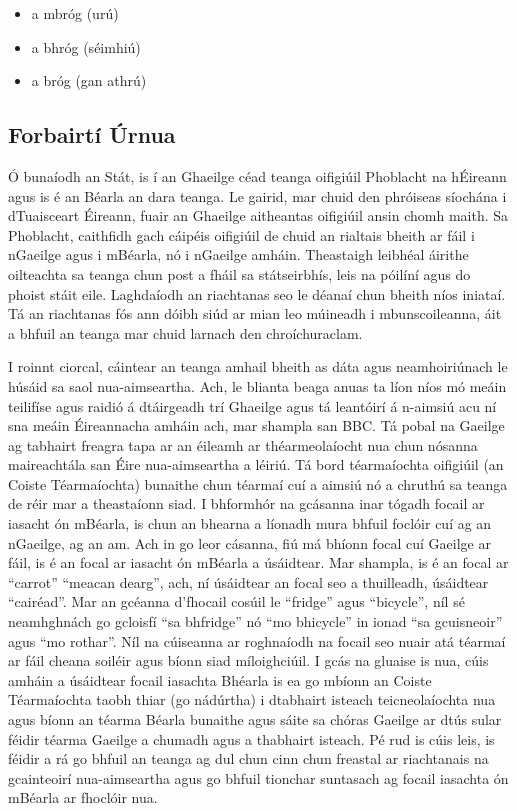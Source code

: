 \documentclass[]{../../metanetpaper}
\begin{document}
\begin{multicols}{2}
\begin{itemize}
\item a mbróg (urú)
\item a bhróg (séimhiú)
\item a bróg (gan athrú)
\end{itemize}  



\subsection{Forbairtí Úrnua}

Ó bunaíodh an Stát, is í an Ghaeilge céad teanga oifigiúil Phoblacht na hÉireann agus is é an Béarla an dara teanga. Le gairid, mar chuid den phróiseas síochána i dTuaisceart Éireann, fuair an Ghaeilge aitheantas oifigiúil ansin chomh maith. Sa Phoblacht, caithfidh gach cáipéis oifigiúil de chuid an rialtais bheith ar fáil i nGaeilge agus i mBéarla, nó i nGaeilge amháin. Theastaigh leibhéal áirithe oilteachta sa teanga chun post a fháil sa státseirbhís, leis na póilíní agus do phoist stáit eile. Laghdaíodh an riachtanas seo le déanaí chun bheith níos iniataí. Tá an riachtanas fós ann dóibh siúd ar mian leo múineadh i mbunscoileanna, áit a bhfuil an teanga mar chuid larnach den chroíchuraclam.

I roinnt ciorcal, cáintear an teanga amhail bheith as dáta agus neamhoiriúnach le húsáid sa saol nua-aimseartha. Ach, le blianta beaga anuas ta líon níos mó meáin teilifíse agus raidió á dtáirgeadh trí Ghaeilge agus tá leantóirí á n-aimsiú acu ní sna meáin Éireannacha amháin ach, mar shampla san BBC. Tá pobal na Gaeilge ag tabhairt freagra tapa ar an éileamh ar théarmeolaíocht nua chun nósanna maireachtála san Éire nua-aimseartha a léiriú. Tá bord téarmaíochta oifigiúil (an Coiste Téarmaíochta) bunaithe chun téarmaí cuí a aimsiú nó a chruthú sa teanga de réir mar a theastaíonn siad. I bhformhór na gcásanna inar tógadh focail ar iasacht ón mBéarla, is chun an bhearna a líonadh mura bhfuil foclóir cuí ag an nGaeilge, ag an am. Ach in go leor cásanna, fiú má bhíonn focal cuí Gaeilge ar fáil, is é an focal ar iasacht ón mBéarla a úsáidtear. Mar shampla, is é an focal ar ``carrot'' ``meacan dearg'', ach, ní úsáidtear an focal seo a thuilleadh, úsáidtear ``cairéad''. Mar an gcéanna d'fhocail cosúil le ``fridge'' agus ``bicycle'', níl sé neamhghnách go gcloisfí ``sa bhfridge'' nó ``mo bhicycle'' in ionad ``sa gcuisneoir'' agus ``mo rothar''. Níl na cúiseanna ar roghnaíodh na focail seo nuair atá téarmaí ar fáil cheana soiléir agus bíonn siad míloighciúil. I gcás na gluaise is nua, cúis amháin a úsáidtear focail iasachta Bhéarla is ea go mbíonn an Coiste Téarmaíochta taobh thiar (go nádúrtha) i dtabhairt isteach teicneolaíochta nua agus bíonn an téarma Béarla bunaithe agus sáite sa chóras Gaeilge ar dtús sular féidir téarma Gaeilge a chumadh agus a thabhairt isteach. Pé rud is cúis leis, is féidir a rá go bhfuil an teanga ag dul chun cinn chun freastal ar riachtanais na gcainteoirí nua-aimseartha agus go bhfuil tionchar suntasach ag focail iasachta ón mBéarla ar fhoclóir nua.


\end{multicols}
\end{document}
